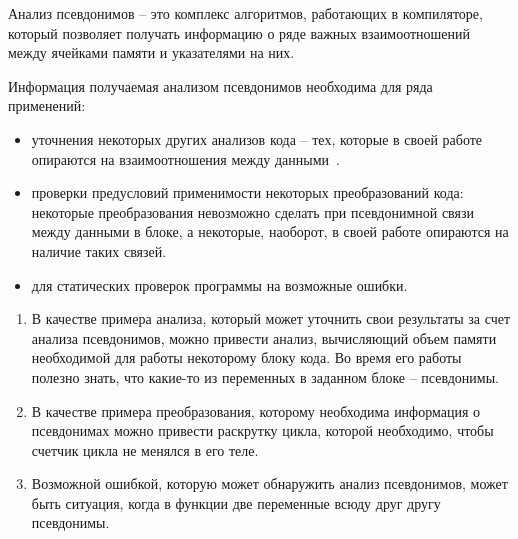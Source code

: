 





\Intro


\begin{mydefinition}
Анализ псевдонимов -- это комплекс алгоритмов, работающих в компиляторе, который позволяет получать информацию о ряде важных взаимоотношений между ячейками памяти и указателями на них.
\end{mydefinition}

Информация получаемая анализом псевдонимов необходима для ряда применений:
\begin{itemize}
\item уточнения некоторых других анализов кода -- тех, которые в своей работе опираются на взаимоотношения между данными~\autocite{Voevodin}.
\item проверки предусловий применимости некоторых преобразований кода: некоторые преобразования невозможно сделать при псевдонимной связи между данными в блоке, а некоторые, наоборот, в своей работе опираются на наличие таких связей.
\item для статических проверок программы на возможные ошибки.
\end{itemize}

\begin{myexamples}
\begin{enumerate}
\item В качестве примера анализа, который может уточнить свои результаты за счет анализа псевдонимов, можно привести анализ, вычисляющий объем памяти необходимой для работы некоторому блоку кода. Во время его работы полезно знать, что какие-то из переменных в заданном блоке -- псевдонимы.
\item В качестве примера преобразования, которому необходима информация о псевдонимах можно привести раскрутку цикла, которой необходимо, чтобы счетчик цикла не менялся в его теле.
\item Возможной ошибкой, которую может обнаружить анализ псевдонимов, может быть ситуация, когда в функции две переменные всюду друг другу псевдонимы.
\end{enumerate}
\end{myexamples}

